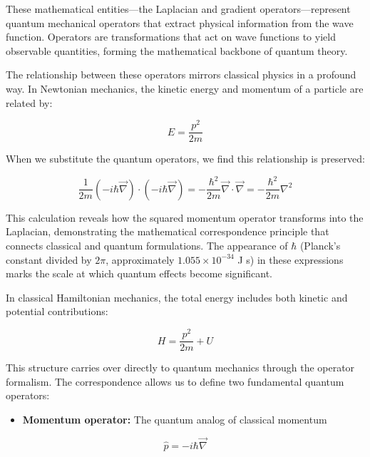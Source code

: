 \documentclass[10pt]{article}
\begin{document}
These mathematical entities—the Laplacian and gradient operators—represent quantum mechanical operators that extract physical information from the wave function. Operators are transformations that act on wave functions to yield observable quantities, forming the mathematical backbone of quantum theory.

The relationship between these operators mirrors classical physics in a profound way. In Newtonian mechanics, the kinetic energy and momentum of a particle are related by:

\begin{equation*}
E=\frac{p^{2}}{2 m} \tag{1.10}
\end{equation*}

When we substitute the quantum operators, we find this relationship is preserved:

\begin{equation*}
\frac{1}{2 m}(-i \hbar \vec{\nabla}) \cdot(-i \hbar \vec{\nabla})=-\frac{\hbar^{2}}{2 m} \vec{\nabla} \cdot \vec{\nabla}=-\frac{\hbar^{2}}{2 m} \nabla^{2} \tag{1.11}
\end{equation*}

This calculation reveals how the squared momentum operator transforms into the Laplacian, demonstrating the mathematical correspondence principle that connects classical and quantum formulations. The appearance of $\hbar$ (Planck's constant divided by $2\pi$, approximately $1.055 \times 10^{-34}$ J s) in these expressions marks the scale at which quantum effects become significant.

In classical Hamiltonian mechanics, the total energy includes both kinetic and potential contributions:

\begin{equation*}
H=\frac{p^{2}}{2 m}+U \tag{1.12}
\end{equation*}

This structure carries over directly to quantum mechanics through the operator formalism. The correspondence allows us to define two fundamental quantum operators:

\begin{itemize}
  \item \textbf{Momentum operator:} The quantum analog of classical momentum
\end{itemize}

\begin{equation*}
\hat{p}=-i \hbar \vec{\nabla} \tag{1.13}
\end{equation*}
\end{document}
